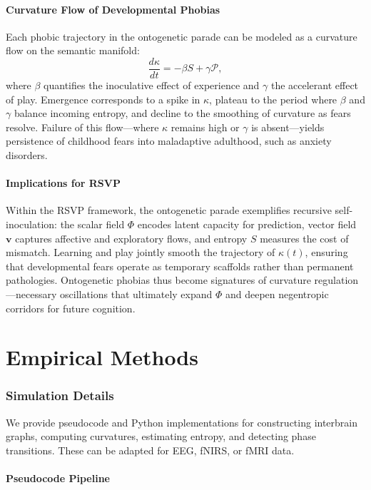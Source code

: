 \documentclass{article}
\theoremstyle{definition}
\begin{document}
\subsection{Curvature Flow of Developmental Phobias}

Each phobic trajectory in the ontogenetic parade can be modeled as a curvature
flow on the semantic manifold:
\[
\frac{d\kappa}{dt} = - \beta S + \gamma \mathcal{P},
\]
where $\beta$ quantifies the inoculative effect of experience and $\gamma$ the
accelerant effect of play. Emergence corresponds to a spike in $\kappa$, plateau
to the period where $\beta$ and $\gamma$ balance incoming entropy, and decline to
the smoothing of curvature as fears resolve. Failure of this flow---where
$\kappa$ remains high or $\gamma$ is absent---yields persistence of childhood
fears into maladaptive adulthood, such as anxiety disorders.

\subsection{Implications for RSVP}

Within the RSVP framework, the ontogenetic parade exemplifies recursive
self-inoculation: the scalar field $\Phi$ encodes latent capacity for prediction,
vector field $\mathbf{v}$ captures affective and exploratory flows, and entropy
$S$ measures the cost of mismatch. Learning and play jointly smooth the
trajectory of $\kappa(t)$, ensuring that developmental fears operate as
temporary scaffolds rather than permanent pathologies. Ontogenetic phobias thus
become signatures of curvature regulation---necessary oscillations that
ultimately expand $\Phi$ and deepen negentropic corridors for future cognition.

\part{Empirical Methods}

\section{Simulation Details}

We provide pseudocode and Python implementations for constructing interbrain
graphs, computing curvatures, estimating entropy, and detecting phase
transitions. These can be adapted for EEG, fNIRS, or fMRI data.

\subsection{Pseudocode Pipeline}
\end{document}
